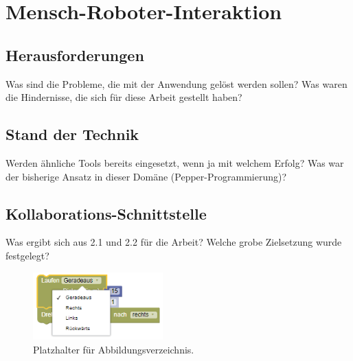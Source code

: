 \chapter{Mensch-Roboter-Interaktion} %

\section{Herausforderungen} %
Was sind die Probleme, die mit der Anwendung gelöst werden sollen? Was waren die Hindernisse, die sich für diese Arbeit gestellt haben? 

\section{Stand der Technik} %
Werden ähnliche Tools bereits eingesetzt, wenn ja mit welchem Erfolg? Was war der bisherige Ansatz in dieser Domäne (Pepper-Programmierung)?

\section{Kollaborations-Schnittstelle} %
Was ergibt sich aus 2.1 und 2.2 für die Arbeit? Welche grobe Zielsetzung wurde festgelegt?





\begin{figure} %
	\centering
	\includegraphics[width=5cm]{Plots/zz-placeholder.png}
	\caption{Platzhalter für Abbildungsverzeichnis.}
	\label{fig:placeholder}
\end{figure}